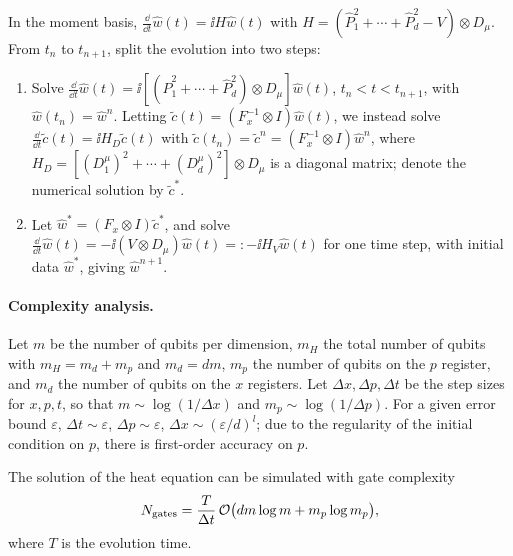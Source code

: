 In the moment basis, $\tfrac{\dd}{\dd t}\hat{w}(t) = \ii H\hat{w}(t)$ with
$H = (\hat{P}_1^2 + \cdots + \hat{P}_d^2 - V) \otimes D_\mu$. From $t_n$ to
$t_{n+1}$, split the evolution into two steps:
\begin{enumerate}
  \item Solve $\tfrac{\dd}{\dd t}\hat{w}(t) = \ii[(\hat{P}_1^2 + \cdots + \hat{P}_d^2) \otimes D_\mu]\hat{w}(t)$,
    $t_n < t < t_{n+1}$, with $\hat{w}(t_n) = \hat{w}^n$. Letting
    $\tilde{c}(t) = (F_x^{-1} \otimes I)\hat{w}(t)$, we instead solve
    $\tfrac{\dd}{\dd t}\tilde{c}(t) = \ii H_D \tilde{c}(t)$ with
    $\tilde{c}(t_n) = \tilde{c}^n = (F_x^{-1} \otimes I)\hat{w}^n$, where
    $H_D = [(D_1^\mu)^2 + \cdots + (D_d^\mu)^2] \otimes D_\mu$ is a diagonal
    matrix; denote the numerical solution by $\tilde{c}^*$.
  \item Let $\hat{w}^* = (F_x \otimes I)\tilde{c}^*$, and solve
    $\tfrac{\dd}{\dd t}\hat{w}(t) = -\ii(V \otimes D_\mu)\hat{w}(t) =: -\ii H_V\hat{w}(t)$
    for one time step, with initial data $\hat{w}^*$, giving $\hat{w}^{n+1}$.
\end{enumerate}

\paragraph{Complexity analysis.}
Let $m$ be the number of qubits per dimension, $m_H$ the total number of qubits
with $m_H = m_d + m_p$ and $m_d = dm$, $m_p$ the number of qubits on the $p$
register, and $m_d$ the number of qubits on the $x$ registers. Let
$\Delta x, \Delta p, \Delta t$ be the step sizes for $x, p, t$, so that
$m \sim \log(1/\Delta x)$ and $m_p \sim \log(1/\Delta p)$. For a given error bound
$\varepsilon$, $\Delta t \sim \varepsilon$, $\Delta p \sim \varepsilon$,
$\Delta x \sim (\varepsilon/d)^l$; due to the regularity of the initial condition
on $p$, there is first-order accuracy on $p$.

\begin{theorem}
The solution of the heat equation can be simulated with gate complexity
\begin{equation}
  N_{\mathrm{gates}} = \frac{T}{\Delta t}\, \mathcal{O}\bigl(dm\log m + m_p \log m_p\bigr),
\end{equation}
where $T$ is the evolution time.
\end{theorem}

